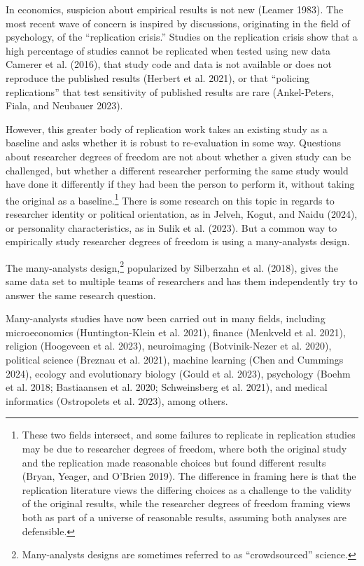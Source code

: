 \documentclass[
  letterpaper,
  DIV=11,
  numbers=noendperiod]{scrartcl}
\begin{document}
In economics, suspicion about empirical results is not new (Leamer
1983). The most recent wave of concern is inspired by discussions,
originating in the field of psychology, of the ``replication crisis.''
Studies on the replication crisis show that a high percentage of studies
cannot be replicated when tested using new data Camerer et al. (2016),
that study code and data is not available or does not reproduce the
published results (Herbert et al. 2021), or that ``policing
replications'' that test sensitivity of published results are rare
(Ankel-Peters, Fiala, and Neubauer 2023).

However, this greater body of replication work takes an existing study
as a baseline and asks whether it is robust to re-evaluation in some
way. Questions about researcher degrees of freedom are not about whether
a given study can be challenged, but whether a different researcher
performing the same study would have done it differently if they had
been the person to perform it, without taking the original as a
baseline.\footnote{These two fields intersect, and some failures to
  replicate in replication studies may be due to researcher degrees of
  freedom, where both the original study and the replication made
  reasonable choices but found different results (Bryan, Yeager, and
  O'Brien 2019). The difference in framing here is that the replication
  literature views the differing choices as a challenge to the validity
  of the original results, while the researcher degrees of freedom
  framing views both as part of a universe of reasonable results,
  assuming both analyses are defensible.} There is some research on this
topic in regards to researcher identity or political orientation, as in
Jelveh, Kogut, and Naidu (2024), or personality characteristics, as in
Sulik et al. (2023). But a common way to empirically study researcher
degrees of freedom is using a many-analysts design.

The many-analysts design,\footnote{Many-analysts designs are sometimes
  referred to as ``crowdsourced'' science.} popularized by Silberzahn et
al. (2018), gives the same data set to multiple teams of researchers and
has them independently try to answer the same research question.

Many-analysts studies have now been carried out in many fields,
including microeconomics (Huntington-Klein et al. 2021), finance
(Menkveld et al. 2021), religion (Hoogeveen et al. 2023), neuroimaging
(Botvinik-Nezer et al. 2020), political science (Breznau et al. 2021),
machine learning (Chen and Cummings 2024), ecology and evolutionary
biology (Gould et al. 2023), psychology (Boehm et al. 2018; Bastiaansen
et al. 2020; Schweinsberg et al. 2021), and medical informatics
(Ostropolets et al. 2023), among others.
\end{document}
